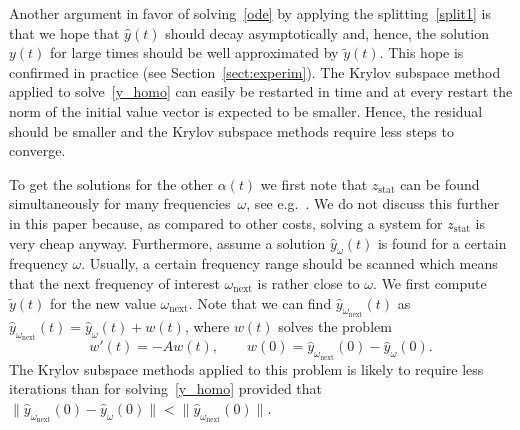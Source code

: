 \documentclass[11pt]{elsarticle}
\newcommand{\yh}{\widehat{y}}
\newcommand{\yt}{\widetilde{y}}
\newcommand{\zstat}{z_{\mathrm{stat}}}
\begin{document}
Another argument in favor of solving~\eqref{ode} by applying 
the splitting~\eqref{split1} is that we hope that $\yh(t)$ should
decay asymptotically and, hence, the solution $y(t)$
for large times should be well approximated by $\yt(t)$.  This 
hope is confirmed in practice (see Section~\ref{sect:experim}).
The Krylov subspace method applied to solve~\eqref{y_homo}
can easily be restarted in time and at every restart the norm
of the initial value vector is expected to be smaller.
Hence, the residual should be smaller and the Krylov subspace 
methods require less steps to converge.

To get the solutions for the other $\alpha(t)$ we first note that
$\zstat$ can be found simultaneously for many frequencies~$\omega$,
see e.g.~\cite[Section~4.3.1]{Hanse2017_MSc}. 
We do not discuss this further in this paper because, as compared to 
other costs, solving a system for $\zstat$ is very cheap anyway.
Furthermore, assume a solution $\yh_{\omega}(t)$ is found for a certain
frequency $\omega$.  Usually, a certain frequency range should
be scanned which means that the next frequency of interest 
$\omega_{\mathrm{next}}$
is rather close to $\omega$.  We first compute $\yt(t)$
for the new value $\omega_{\mathrm{next}}$.  Note that we can find 
$\yh_{\omega_{\mathrm{next}}}(t)$ 
as $\yh_{\omega_{\mathrm{next}}}(t) = \yh_{\omega}(t) + w(t)$, where $w(t)$ 
solves 
the problem
\begin{equation}
\label{4diff}
w'(t)=-Aw(t), \qquad w(0) = \yh_{\omega_{\mathrm{next}}}(0) -\yh_{\omega}(0).
\end{equation}
The Krylov subspace methods applied to this problem is likely to
require less iterations than for solving~\eqref{y_homo}
provided that 
$\|\yh_{\omega_{\mathrm{next}}}(0) 
-\yh_{\omega}(0)\|<\|\yh_{\omega_{\mathrm{next}}}(0)\|$.
\end{document}
